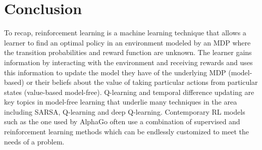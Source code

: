 \section{Conclusion}
To recap, reinforcement learning is a machine learning technique that allows a learner to find an optimal policy in an environment modeled by an MDP where the transition probabilities and reward function are unknown. The learner gains information by interacting with the environment and receiving rewards and uses this information to update the model they have of the underlying MDP (model-based) or their beliefs about the value of taking particular actions from particular states (value-based model-free). Q-learning and temporal difference updating are key topics in model-free learning that underlie many techniques in the area including SARSA, Q-learning and deep Q-learning. Contemporary RL models such as the one used by AlphaGo often use a combination of supervised and reinforcement learning methods which can be endlessly customized to meet the needs of a problem.